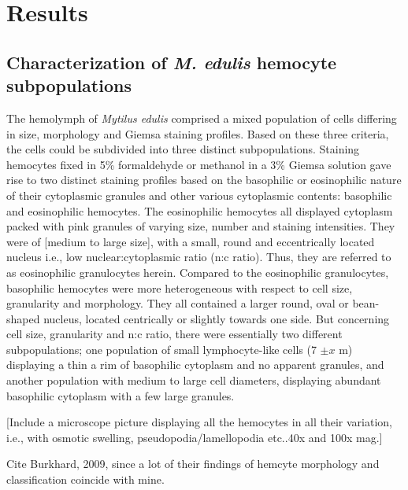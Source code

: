 \chapter{Results}
\label{chap:results}
\section{Characterization of \emph{M. edulis} hemocyte subpopulations}
The hemolymph of \emph{Mytilus edulis} comprised a mixed population of cells differing in size, morphology and Giemsa staining profiles. Based on these three criteria, the cells could be subdivided into three distinct subpopulations. Staining hemocytes fixed in 5\% formaldehyde or methanol in a 3\% Giemsa solution gave rise to two distinct staining profiles based on the basophilic or eosinophilic nature of their cytoplasmic granules and other various cytoplasmic contents: basophilic and eosinophilic hemocytes. The eosinophilic hemocytes all displayed cytoplasm packed with pink granules of varying size, number and staining intensities. They were of [medium to large size], with a small, round and eccentrically located nucleus i.e., low nuclear:cytoplasmic ratio (n:c ratio). Thus, they are referred to as eosinophilic granulocytes herein. Compared to the eosinophilic granulocytes, basophilic hemocytes were more heterogeneous with respect to cell size, granularity and morphology. They all contained a larger round, oval or bean-shaped nucleus, located centrically or slightly towards one side. But concerning cell size, granularity and n:c ratio, there were essentially two different subpopulations; one population of small lymphocyte-like cells (7 $\pm{x}$ \micro m) displaying a thin a rim of basophilic cytoplasm and no apparent granules, and another population with medium to large cell diameters, displaying abundant basophilic cytoplasm with a few large granules.

[Include a microscope picture displaying all the hemocytes in all their variation, i.e., with osmotic swelling, pseudopodia/lamellopodia etc..40x and 100x mag.]

Cite Burkhard, 2009, since a lot of their findings of hemcyte morphology and classification coincide with mine.


